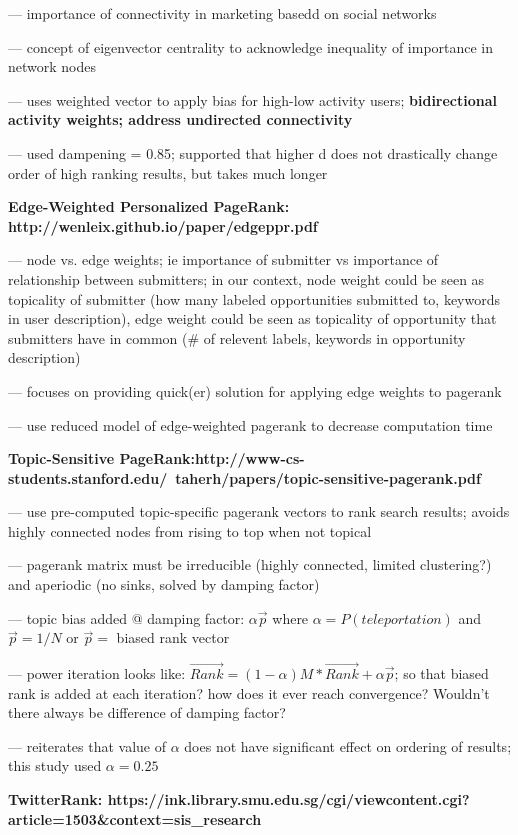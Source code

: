 \documentclass[]{report}   %
\begin{document}
\cite{heidemann_klier_probst_2012}
--- importance of connectivity in marketing basedd on social networks

--- concept of eigenvector centrality to acknowledge inequality of importance in network nodes

--- uses weighted vector to apply bias for high-low activity users; \textbf{ bidirectional activity weights; address undirected connectivity}

--- used dampening = 0.85; supported that higher d does not drastically change order of high ranking results, but takes much longer

\textbf{Edge-Weighted Personalized PageRank: http://wenleix.github.io/paper/edgeppr.pdf}

--- node vs. edge weights; ie importance of submitter vs importance of relationship between submitters; in our context, node weight could be seen as topicality of submitter (how many labeled opportunities submitted to, keywords in user description), edge weight could be seen as topicality of opportunity that submitters have in common (\# of relevent labels, keywords in opportunity description)

--- focuses on providing quick(er) solution for applying edge weights to pagerank

--- use reduced model of edge-weighted pagerank to decrease computation time

\textbf{Topic-Sensitive PageRank:http://www-cs-students.stanford.edu/~taherh/papers/topic-sensitive-pagerank.pdf}

--- use pre-computed topic-specific pagerank vectors to rank search results; avoids highly connected nodes from rising to top when not topical

--- pagerank matrix must be irreducible (highly connected, limited clustering?) and aperiodic (no sinks, solved by damping factor)

--- topic bias added @ damping factor: $\alpha \vec{p}$ where $\alpha = P(teleportation)$ and $\vec{p} = 1/N$ or $\vec{p} =$ biased rank vector

--- power iteration looks like: $\vec{Rank} = (1- \alpha )M * \vec{Rank} + \alpha \vec{p}$; so that biased rank is added at each iteration? how does it ever reach convergence? Wouldn't there always be difference of damping factor?

--- reiterates that value of $\alpha$ does not have significant effect on ordering of results; this study used $\alpha = 0.25$

\textbf{TwitterRank: https://ink.library.smu.edu.sg/cgi/viewcontent.cgi?article=1503\&context=sis\_research}
\end{document}
